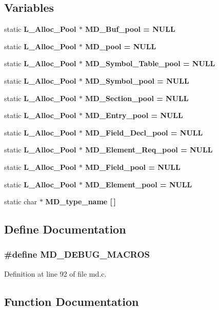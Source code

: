 \subsection*{Variables}
\begin{CompactItemize}
\item 
static \bf{L\_\-Alloc\_\-Pool} $\ast$ \bf{MD\_\-Buf\_\-pool} = NULL
\item 
static \bf{L\_\-Alloc\_\-Pool} $\ast$ \bf{MD\_\-pool} = NULL
\item 
static \bf{L\_\-Alloc\_\-Pool} $\ast$ \bf{MD\_\-Symbol\_\-Table\_\-pool} = NULL
\item 
static \bf{L\_\-Alloc\_\-Pool} $\ast$ \bf{MD\_\-Symbol\_\-pool} = NULL
\item 
static \bf{L\_\-Alloc\_\-Pool} $\ast$ \bf{MD\_\-Section\_\-pool} = NULL
\item 
static \bf{L\_\-Alloc\_\-Pool} $\ast$ \bf{MD\_\-Entry\_\-pool} = NULL
\item 
static \bf{L\_\-Alloc\_\-Pool} $\ast$ \bf{MD\_\-Field\_\-Decl\_\-pool} = NULL
\item 
static \bf{L\_\-Alloc\_\-Pool} $\ast$ \bf{MD\_\-Element\_\-Req\_\-pool} = NULL
\item 
static \bf{L\_\-Alloc\_\-Pool} $\ast$ \bf{MD\_\-Field\_\-pool} = NULL
\item 
static \bf{L\_\-Alloc\_\-Pool} $\ast$ \bf{MD\_\-Element\_\-pool} = NULL
\item 
static char $\ast$ \bf{MD\_\-type\_\-name} [$\,$]
\end{CompactItemize}


\subsection{Define Documentation}
\subsubsection{\setlength{\rightskip}{0pt plus 5cm}\#define MD\_\-DEBUG\_\-MACROS}\label{md_8c_e7f9e74008b6fd5aacf14ed3e9c8bdf2}




Definition at line 92 of file md.c.

\subsection{Function Documentation}
